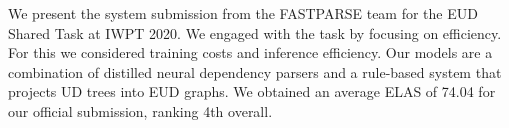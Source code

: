 We present the system submission from the FASTPARSE team for the EUD Shared Task at IWPT 2020. We engaged with the task by focusing on efficiency. For this we considered training costs and inference efficiency. Our models are a combination of distilled neural dependency parsers and a rule-based system that projects UD trees into EUD graphs. We obtained an average ELAS of 74.04 for our official submission, ranking 4th overall.
